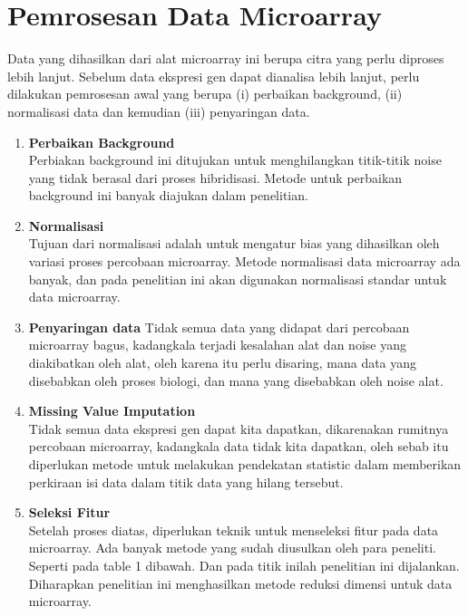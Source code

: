 \section{Pemrosesan Data Microarray}
Data yang dihasilkan dari alat microarray ini berupa citra yang perlu diproses lebih lanjut. Sebelum data ekspresi gen dapat dianalisa lebih lanjut, perlu dilakukan pemrosesan awal yang berupa (i) perbaikan background, (ii) normalisasi data dan kemudian (iii) penyaringan data.
\begin{enumerate}
\item{\textbf{Perbaikan Background}}\\
Perbiakan background ini ditujukan untuk menghilangkan titik-titik noise yang tidak berasal dari proses hibridisasi. Metode untuk perbaikan background ini banyak diajukan dalam penelitian\citep{fakoorusing}. 
\item{\textbf{Normalisasi}}\\
Tujuan dari normalisasi adalah untuk mengatur bias yang dihasilkan oleh variasi proses percobaan microarray. Metode normalisasi data microarray ada banyak, dan pada penelitian ini akan digunakan normalisasi standar untuk data microarray.
\item{\textbf{Penyaringan data}}
Tidak semua data yang didapat dari percobaan microarray bagus, kadangkala terjadi kesalahan alat dan noise yang diakibatkan oleh alat, oleh karena itu perlu disaring, mana data yang disebabkan oleh proses biologi, dan mana yang disebabkan oleh noise alat.
\item{\textbf{Missing Value Imputation}}\\
Tidak semua data ekspresi gen dapat kita dapatkan, dikarenakan rumitnya percobaan microarray, kadangkala data tidak kita dapatkan, oleh sebab itu diperlukan metode untuk melakukan pendekatan statistic dalam memberikan perkiraan isi data dalam titik data yang hilang tersebut.
\item{\textbf{Seleksi Fitur}}\\
Setelah proses diatas, diperlukan teknik untuk menseleksi fitur pada data microarray. Ada banyak metode yang sudah diusulkan oleh para peneliti. Seperti pada table 1 dibawah. Dan pada titik inilah penelitian ini dijalankan. Diharapkan penelitian ini menghasilkan metode reduksi dimensi untuk data microarray.

\end{enumerate}

